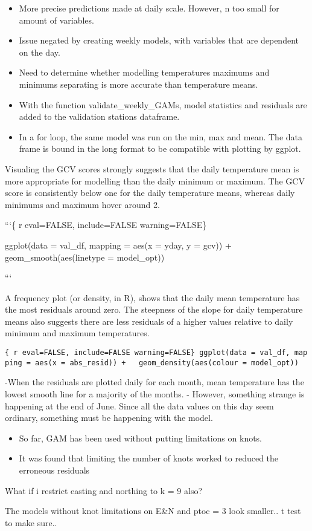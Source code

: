\documentclass[]{article}
\providecommand{\tightlist}{%
  \setlength{\itemsep}{0pt}\setlength{\parskip}{0pt}}
\begin{document}
\begin{itemize}
\tightlist
\item
  More precise predictions made at daily scale. However, n too small for
  amount of variables.
\item
  Issue negated by creating weekly models, with variables that are
  dependent on the day.
\item
  Need to determine whether modelling temperatures maximums and minimums
  separating is more accurate than temperature means.
\item
  With the function validate\_weekly\_GAMs, model statistics and
  residuals are added to the validation stations dataframe.
\item
  In a for loop, the same model was run on the min, max and mean. The
  data frame is bound in the long format to be compatible with plotting
  by ggplot.
\end{itemize}

Visualing the GCV scores strongly suggests that the daily temperature
mean is more appropriate for modelling than the daily minimum or
maximum. The GCV score is consistently below one for the daily
temperature means, whereas daily minimums and maximum hover around 2.

```\{ r eval=FALSE, include=FALSE warning=FALSE\}

ggplot(data = val\_df, mapping = aes(x = yday, y = gcv)) +
geom\_smooth(aes(linetype = model\_opt))

```

A frequency plot (or density, in R), shows that the daily mean
temperature has the most residuals around zero. The steepness of the
slope for daily temperature means also suggests there are less residuals
of a higher values relative to daily minimum and maximum temperatures.

\texttt{\{\ r\ eval=FALSE,\ include=FALSE\ warning=FALSE\}\ ggplot(data\ =\ val\_df,\ mapping\ =\ aes(x\ =\ abs\_resid))\ +\ \ \ geom\_density(aes(colour\ =\ model\_opt))}

-When the residuals are plotted daily for each month, mean temperature
has the lowest smooth line for a majority of the months. - However,
something strange is happening at the end of June. Since all the data
values on this day seem ordinary, something must be happening with the
model.

\begin{itemize}
\tightlist
\item
  So far, GAM has been used without putting limitations on knots.
\item
  It was found that limiting the number of knots worked to reduced the
  erroneous residuals
\end{itemize}

What if i restrict easting and northing to k = 9 also?

The models without knot limitations on E\&N and ptoc = 3 look smaller..
t test to make sure..
\end{document}
